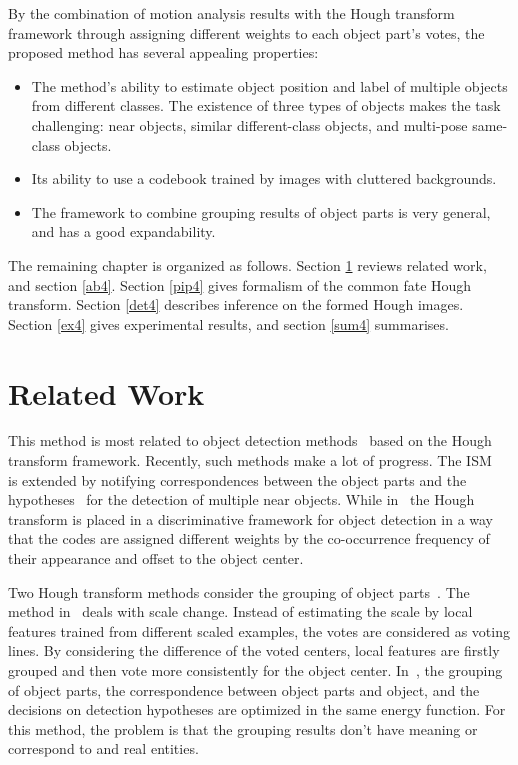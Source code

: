 By the combination of motion analysis results with the Hough transform framework through assigning different weights to each object part's votes, the proposed method has several appealing properties:
\begin{itemize}
\item {The method's ability to estimate object position and label of multiple objects from different classes. The existence of three types of objects makes the task challenging: near objects, similar different-class objects, and multi-pose same-class objects.}
\item {Its ability to use a codebook trained by images with cluttered backgrounds.}
\item {The framework to combine grouping results of object parts is very general, and has a good expandability.}
\end{itemize}

The remaining chapter is organized as follows. Section \ref{rw4} reviews related work, and section \ref{ab4}. Section \ref{pip4}  gives formalism of the common fate Hough transform. Section \ref{det4} describes inference on the formed Hough images. Section \ref{ex4} gives experimental results, and section \ref{sum4} summarises.

\section{Related Work}
\label{rw4}

 This method is most related to object detection methods~\cite{ac9,ac22,lb1,ac5,ac10,ac21} based on the Hough transform framework. Recently, such methods make a lot of progress. The ISM~\cite{lb1,ac5} is extended  by notifying correspondences between the object parts and the hypotheses~\cite{ac9} for the detection of multiple near objects. While in~\cite{ac6,ac10,ac7} the Hough transform is placed in a discriminative framework for object detection in a way that the codes are assigned different weights by the co-occurrence frequency of their appearance and offset to the object center.

Two Hough transform methods consider the grouping of object parts~\cite{ac26,ac25}. The method in~\cite{ac26} deals with scale change. Instead of estimating the scale by local features trained from different scaled examples, the votes are considered as voting lines. By considering the difference of the voted centers, local features are firstly grouped and then vote more consistently for the object center. In~\cite{ac25}, the grouping of object parts, the correspondence between object parts and object, and the decisions on detection hypotheses are optimized in the same energy function. For this method, the problem is that the grouping results don't have meaning or correspond to and real entities.

